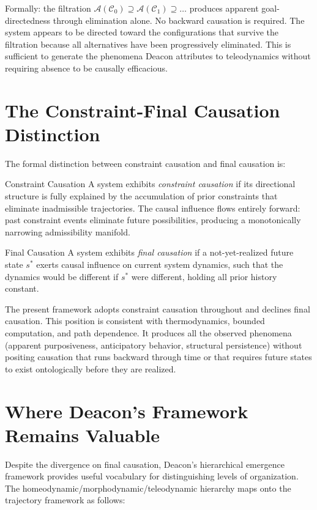 Formally: the filtration $\mathcal{A}(\mathcal{C}_0) \supseteq
\mathcal{A}(\mathcal{C}_1) \supseteq \ldots$ produces apparent goal-directedness
through elimination alone. No backward causation is required. The system appears
to be directed toward the configurations that survive the filtration because all
alternatives have been progressively eliminated. This is sufficient to generate
the phenomena Deacon attributes to teleodynamics without requiring absence to be
causally efficacious.

\section{The Constraint-Final Causation Distinction}

The formal distinction between constraint causation and final causation is:

\begin{definition}{Constraint Causation}
A system exhibits \emph{constraint causation} if its directional structure
is fully explained by the accumulation of prior constraints that eliminate
inadmissible trajectories. The causal influence flows entirely forward:
past constraint events eliminate future possibilities, producing a
monotonically narrowing admissibility manifold.
\end{definition}

\begin{definition}{Final Causation}
A system exhibits \emph{final causation} if a not-yet-realized future state
$s^*$ exerts causal influence on current system dynamics, such that the
dynamics would be different if $s^*$ were different, holding all prior
history constant.
\end{definition}

The present framework adopts constraint causation throughout and declines final
causation. \claimC This position is consistent with thermodynamics, bounded
computation, and path dependence. It produces all the observed phenomena
(apparent purposiveness, anticipatory behavior, structural persistence) without
positing causation that runs backward through time or that requires future
states to exist ontologically before they are realized.

\section{Where Deacon's Framework Remains Valuable}

Despite the divergence on final causation, Deacon's hierarchical emergence
framework provides useful vocabulary for distinguishing levels of organization.
The homeodynamic/morphodynamic/teleodynamic hierarchy maps onto the trajectory
framework as follows:

